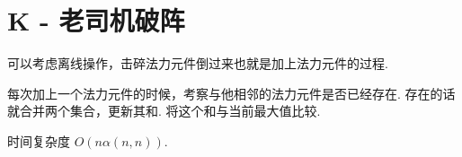 \documentclass{ctexart}
\begin{document}
\section*{K - 老司机破阵}

可以考虑离线操作，击碎法力元件倒过来也就是加上法力元件的过程.

每次加上一个法力元件的时候，考察与他相邻的法力元件是否已经存在.
存在的话就合并两个集合，更新其和. 
将这个和与当前最大值比较.

时间复杂度 $O(n\alpha(n,n))$.
\end{document}
